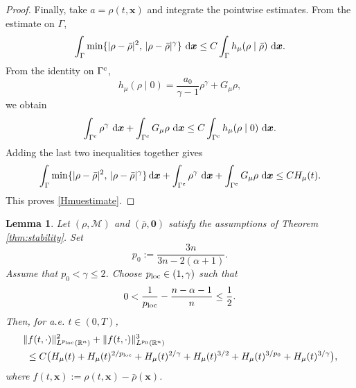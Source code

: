 \documentclass[reqno,11pt]{amsart}
\numberwithin{equation}{section}
\newtheorem{lemma}[theorem]{Lemma}
\theoremstyle{definition}
\def\dd{{\, \rm d}}
\begin{document}
\begin{proof}
Finally, take $a=\rho(t,\boldsymbol{x})$ and integrate the pointwise
estimates.  From the estimate on $\Gamma$,
\[ \int_\Gamma  \min\{|\rho-\bar\rho|^2,\,|\rho-\bar\rho|^\gamma\}   \,\dd\boldsymbol{x}  \le  C \int_\Gamma h_\mu(\rho\mid\bar\rho)\,\dd\boldsymbol{x}.
\]
From the identity on $\Gamma^{\rm c}$,
\[  h_\mu(\rho\mid0)  =  \frac{a_0}{\gamma-1}\rho^\gamma+G_\mu\rho ,
\]
we obtain
\[  \int_{\Gamma^{\rm c}}\rho^\gamma\,\dd\boldsymbol{x}  +  \int_{\Gamma^{\rm c}}G_\mu\rho\,\dd\boldsymbol{x} \le  C \int_{\Gamma^{\rm c}} h_\mu(\rho\mid0)\,\dd\boldsymbol{x}.
\]
Adding the last two inequalities together gives
\[ \int_\Gamma
\min\{|\rho-\bar\rho|^2,\,|\rho-\bar\rho|^\gamma\} \dd\boldsymbol{x}
 +\int_{\Gamma^{\rm c}}\rho^\gamma\,\dd\boldsymbol{x}
 +
  \int_{\Gamma^{\rm c}}G_\mu\rho\,\dd\boldsymbol{x} \le C H_\mu(t).
\]
This proves \eqref{Hmuestimate}.
\end{proof}

\begin{lemma}
Let $(\rho,\mathcal M)$ and $(\bar\rho,\boldsymbol 0)$ satisfy the assumptions
of {\rm Theorem \ref{thm:stability}}. Set
\[
p_0:=\frac{3n}{3n-2(\alpha+1)}.
\]
Assume that $p_0<\gamma\le2$. Choose
$p_{\rm loc}\in(1,\gamma)$ such that
\begin{equation*}
0<\frac1{p_{\rm loc}}-\frac{n-\alpha-1}{n}\le\frac12.
\end{equation*}
Then, for {\it a.e.} $t\in(0,T)$, 
\begin{align}\label{festimates} 
&\|f(t,\cdot)\|_{L^{p_{\rm loc}}(\mathbb R^n)}^2 + \|f(t,\cdot)\|_{L^{p_0}(\mathbb R^n)}^3 \nonumber\\
&\,\,\le C\big(  H_\mu(t)  +H_\mu(t)^{2/p_{\rm loc}} +H_\mu(t)^{2/\gamma}+H_\mu(t)^{3/2}  +H_\mu(t)^{3/p_0}
  +H_\mu(t)^{3/\gamma} \big),
\end{align}
where $f(t,\boldsymbol{x}):=\rho(t,\boldsymbol{x})-\bar\rho(\boldsymbol{x})$.
\end{lemma}
\end{document}
